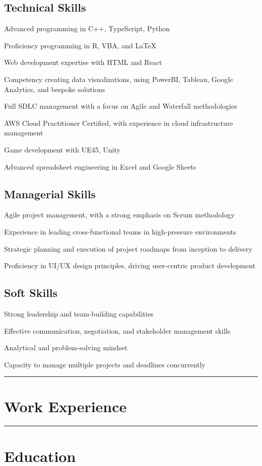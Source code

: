 \documentclass[10.5pt]{article}
\let\tempone\itemize
\let\temptwo\enditemize
\renewenvironment{itemize}{\tempone\addtolength{\itemsep}{-0.5\baselineskip}}{\temptwo}
\newcommand{\hr}{%
	\noindent\rule{\textwidth}{1pt}
	\vspace{-15pt}
}
\begin{document}
	\subsection*{Technical Skills}
	\begin{itemize}
		\item Advanced programming in C++, TypeScript, Python
		\item Proficiency programming in R, VBA, and LaTeX
		\item Web development expertise with HTML and React
		\item Competency creating data visualizations, using PowerBI, Tableau, Google Analytics, and bespoke solutions
		\item Full SDLC management with a focus on Agile and Waterfall methodologies
		\item AWS Cloud Practitioner Certified, with experience in cloud infrastructure management
		\item Game development with \gls{UE45}, \gls{Unity}
		\item Advanced spreadsheet engineering in Excel and Google Sheets
	\end{itemize}

	\subsection*{Managerial Skills}
	\begin{itemize}
		\item Agile project management, with a strong emphasis on Scrum methodology
		\item Experience in leading cross-functional teams in high-pressure environments
		\item Strategic planning and execution of project roadmaps from inception to delivery
		\item Proficiency in UI/UX design principles, driving user-centric product development
	\end{itemize}

	\subsection*{Soft Skills}
	\begin{itemize}
		\item Strong leadership and team-building capabilities
		\item Effective communication, negotiation, and stakeholder management skills
		\item Analytical and problem-solving mindset
		\item Capacity to manage multiple projects and deadlines concurrently
	\end{itemize}

	\hr{}

	\section*{Work Experience}
	\workexperience{}

	\hr{}
	
	\section*{Education}
	\education{}
\end{document}
